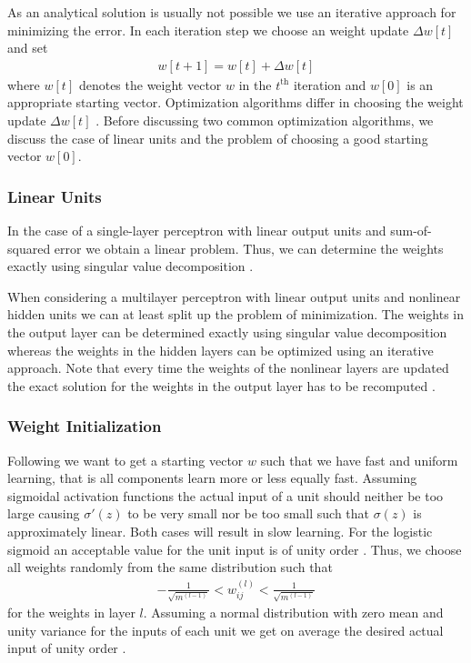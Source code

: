 As an analytical solution is usually not possible we use an iterative approach for minimizing the error. In each iteration step we choose an weight update $\Delta w[t]$ and set
\begin{align}
w[t + 1] = w[t] + \Delta w[t]
\end{align}
where $w[t]$ denotes the weight vector $w$ in the $t^{\text{th}}$ iteration and $w[0]$ is an appropriate starting vector. Optimization algorithms differ in choosing the weight update $\Delta w[t]$ \cite[p.~254-256]{Bishop:1995}. Before discussing two common optimization algorithms, we discuss the case of linear units and the problem of choosing a good starting vector $w[0]$.

\subsubsection{Linear Units}

In the case of a single-layer perceptron with linear output units and sum-of-squared error we obtain a linear problem. Thus, we can determine the weights exactly using singular value decomposition \cite[p.~259-260]{Bishop:1995}.

When considering a multilayer perceptron with linear output units and nonlinear hidden units we can at least split up the problem of minimization. The weights in the output layer can be determined exactly using singular value decomposition whereas the weights in the hidden layers can be optimized using an iterative approach. Note that every time the weights of the nonlinear layers are updated the exact solution for the weights in the output layer has to be recomputed \cite[p.~259-260]{Bishop:1995}.

\subsubsection{Weight Initialization}

Following \cite[p.~311-312]{DudaHartStork:2001} we want to get a starting vector $w$ such that we have fast and uniform learning, that is all components learn more or less equally fast. Assuming sigmoidal activation functions the actual input of a unit should neither be too large causing $\sigma'(z)$ to be very small nor be too small such that $\sigma(z)$ is approximately linear. Both cases will result in slow learning. For the logistic sigmoid an acceptable value for the unit input is of unity order \cite[p.~260-262]{Bishop:1995}. Thus, we choose all weights randomly from the same distribution such that
\begin{align}
- \frac{1}{\sqrt{m^{(l - 1)}}} < w_{ij}^{(l)} < \frac{1}{\sqrt{m^{(l - 1)}}}
\end{align}
for the weights in layer $l$. Assuming a normal distribution with zero mean and unity variance for the inputs of each unit we get on average the desired actual input of unity order \cite[p.~311-312]{DudaHartStork:2001}.

